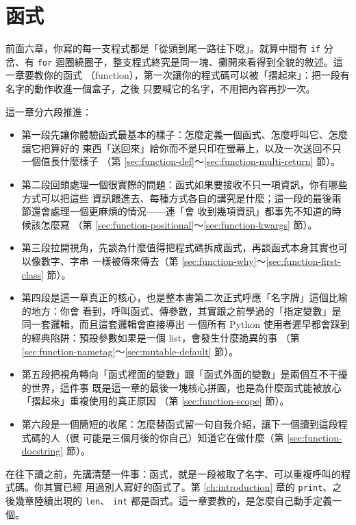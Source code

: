 \chapter{函式}
\label{ch:functions}

前面六章，你寫的每一支程式都是「從頭到尾一路往下唸」。就算中間有 \texttt{if} 分岔、有
\texttt{for} 迴圈繞圈子，整支程式終究是同一塊、攤開來看得到全貌的敘述。這一章要教你的函式
（function），第一次讓你的程式碼可以被「摺起來」：把一段有名字的動作收進一個盒子，之後
只要喊它的名字，不用把內容再抄一次。

這一章分六段推進：

\begin{itemize}
\item 第一段先讓你體驗函式最基本的樣子：怎麼定義一個函式、怎麼呼叫它、怎麼讓它把算好的
東西「送回來」給你而不是只印在螢幕上，以及一次送回不只一個值長什麼樣子
（第 \ref{sec:function-def}～\ref{sec:function-multi-return} 節）。
\item 第二段回頭處理一個很實際的問題：函式如果要接收不只一項資訊，你有哪些方式可以把這些
資訊餵進去、每種方式各自的講究是什麼；這一段的最後兩節還會處理一個更麻煩的情況——連「會
收到幾項資訊」都事先不知道的時候該怎麼寫
（第 \ref{sec:function-positional}～\ref{sec:function-kwargs} 節）。
\item 第三段拉開視角，先談為什麼值得把程式碼拆成函式，再談函式本身其實也可以像數字、字串
一樣被傳來傳去（第 \ref{sec:function-why}～\ref{sec:function-first-class} 節）。
\item 第四段是這一章真正的核心，也是整本書第二次正式呼應「名字牌」這個比喻的地方：你會
看到，呼叫函式、傳參數，其實跟之前學過的「指定變數」是同一套邏輯，而且這套邏輯會直接導出
一個所有 Python 使用者遲早都會踩到的經典陷阱：預設參數如果是一個 list，會發生什麼詭異的事
（第 \ref{sec:function-nametag}～\ref{sec:mutable-default} 節）。
\item 第五段把視角轉向「函式裡面的變數」跟「函式外面的變數」是兩個互不干擾的世界，這件事
既是這一章的最後一塊核心拼圖，也是為什麼函式能被放心「摺起來」重複使用的真正原因
（第 \ref{sec:function-scope} 節）。
\item 第六段是一個簡短的收尾：怎麼替函式留一句自我介紹，讓下一個讀到這段程式碼的人（很
可能是三個月後的你自己）知道它在做什麼（第 \ref{sec:function-docstring} 節）。
\end{itemize}

在往下讀之前，先講清楚一件事：函式，就是一段被取了名字、可以重複呼叫的程式碼。你其實已經
用過別人寫好的函式了。第 \ref{ch:introduction} 章的 \texttt{print}、之後幾章陸續出現的 \texttt{len}、
\texttt{int} 都是函式。這一章要教的，是怎麼自己動手定義一個。

